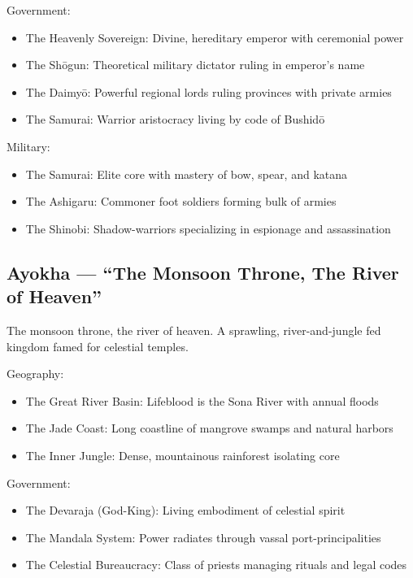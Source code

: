 Government:
\begin{itemize}
    \item The Heavenly Sovereign: Divine, hereditary emperor with ceremonial power
    \item The Shōgun: Theoretical military dictator ruling in emperor's name
    \item The Daimyō: Powerful regional lords ruling provinces with private armies
    \item The Samurai: Warrior aristocracy living by code of Bushidō
\end{itemize}

Military:
\begin{itemize}
    \item The Samurai: Elite core with mastery of bow, spear, and katana
    \item The Ashigaru: Commoner foot soldiers forming bulk of armies
    \item The Shinobi: Shadow-warriors specializing in espionage and assassination
\end{itemize}

\subsection{Ayokha --- ``The Monsoon Throne, The River of Heaven''}
\label{sec:ayokha}

The monsoon throne, the river of heaven. A sprawling, river-and-jungle fed kingdom famed for celestial temples.

Geography:
\begin{itemize}
    \item The Great River Basin: Lifeblood is the Sona River with annual floods
    \item The Jade Coast: Long coastline of mangrove swamps and natural harbors
    \item The Inner Jungle: Dense, mountainous rainforest isolating core
\end{itemize}

Government:
\begin{itemize}
    \item The Devaraja (God-King): Living embodiment of celestial spirit
    \item The Mandala System: Power radiates through vassal port-principalities
    \item The Celestial Bureaucracy: Class of priests managing rituals and legal codes
\end{itemize}

